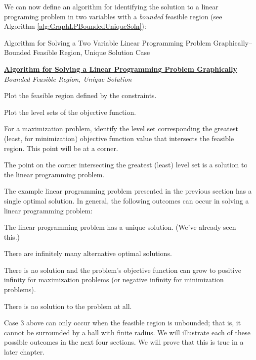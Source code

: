 We can now define an algorithm for identifying the solution to a linear programing problem in two variables with a \textit{bounded} feasible region (see Algorithm \ref{alg:GraphLPBoundedUniqueSoln}): 
\begin{algorithm}
\caption{Algorithm for Solving a Two Variable Linear Programming Problem Graphically--Bounded Feasible Region, Unique Solution Case}
\label{alg:GraphLPBoundedUniqueSoln}
\begin{center}
\begin{minipage}[t]{\textwidth-1em}
\underline{\textbf{Algorithm for Solving a Linear Programming Problem Graphically}}\\
\textit{Bounded Feasible Region, Unique Solution}
\begin{enumerate*}
\item Plot the feasible region defined by the constraints.
\item Plot the level sets of the objective function.
\item For a maximization problem, identify the level set corresponding the greatest (least, for minimization) objective function value that intersects the feasible region. This point will be at a corner. 
\item The point on the corner intersecting the greatest (least) level set is a solution to the linear programming problem.  
\end{enumerate*}
\end{minipage}
\end{center}
\end{algorithm}

The example linear programming problem presented in the previous section has a single optimal solution. In general, the following outcomes can occur in solving a linear programming problem: 
\begin{enumerate*}
\item The linear programming problem has a unique solution. (We've already seen this.)
\item There are infinitely many alternative optimal solutions.
\item There is no solution and the problem's objective function can grow to positive infinity for maximization problems (or negative infinity for minimization problems). 
\item There is no solution to the problem at all. 
\end{enumerate*}

Case 3 above can only occur when the feasible region is unbounded; that is, it cannot be surrounded by a ball with finite radius. We will illustrate each of these possible outcomes in the next four sections. We will prove that this is true in a later chapter.

